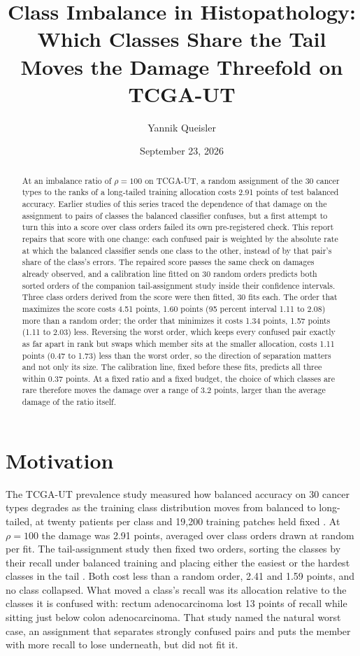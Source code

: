 \documentclass[11pt]{article}
\title{Class Imbalance in Histopathology:\\Which Classes Share the Tail Moves the Damage Threefold on TCGA-UT}
\author{Yannik Queisler}
\date{September 23, 2026}
\begin{document}
\raggedbottom
{}
\setlength{\emergencystretch}{2em}
\maketitle
\begin{abstract}
\noindent At an imbalance ratio of $\rho=100$ on TCGA-UT, a random assignment of the 30 cancer types to the ranks of a long-tailed training allocation costs 2.91 points of test balanced accuracy. Earlier studies of this series traced the dependence of that damage on the assignment to pairs of classes the balanced classifier confuses, but a first attempt to turn this into a score over class orders failed its own pre-registered check. This report repairs that score with one change: each confused pair is weighted by the absolute rate at which the balanced classifier sends one class to the other, instead of by that pair's share of the class's errors. The repaired score passes the same check on damages already observed, and a calibration line fitted on 30 random orders predicts both sorted orders of the companion tail-assignment study inside their confidence intervals. Three class orders derived from the score were then fitted, 30 fits each. The order that maximizes the score costs 4.51 points, 1.60 points (95 percent interval 1.11 to 2.08) more than a random order; the order that minimizes it costs 1.34 points, 1.57 points (1.11 to 2.03) less. Reversing the worst order, which keeps every confused pair exactly as far apart in rank but swaps which member sits at the smaller allocation, costs 1.11 points (0.47 to 1.73) less than the worst order, so the direction of separation matters and not only its size. The calibration line, fixed before these fits, predicts all three within 0.37 points. At a fixed ratio and a fixed budget, the choice of which classes are rare therefore moves the damage over a range of 3.2 points, larger than the average damage of the ratio itself.
\end{abstract}

\section{Motivation}
\label{sec:motivation}
The TCGA-UT prevalence study measured how balanced accuracy on 30 cancer types degrades as the training class distribution moves from balanced to long-tailed, at twenty patients per class and 19,200 training patches held fixed \citep{queisler2026prevalenceTcga}. At $\rho=100$ the damage was 2.91 points, averaged over class orders drawn at random per fit. The tail-assignment study then fixed two orders, sorting the classes by their recall under balanced training and placing either the easiest or the hardest classes in the tail \citep{queisler2026tailTcga}. Both cost less than a random order, 2.41 and 1.59 points, and no class collapsed. What moved a class's recall was its allocation relative to the classes it is confused with: rectum adenocarcinoma lost 13 points of recall while sitting just below colon adenocarcinoma. That study named the natural worst case, an assignment that separates strongly confused pairs and puts the member with more recall to lose underneath, but did not fit it.
\end{document}
